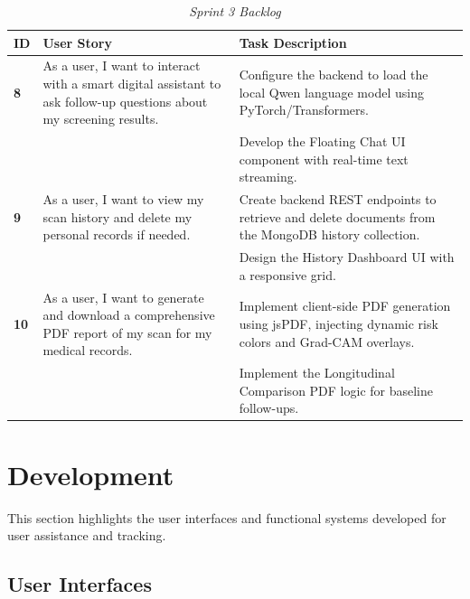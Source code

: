 \begin{table}[H]
	\centering
	\small
	\renewcommand{\arraystretch}{1.2}
	\begin{tabular}{|>{\centering\arraybackslash}p{0.8cm}|>{\raggedright\arraybackslash}p{4.5cm}|>{\raggedright\arraybackslash}p{6.8cm}|}
		\hline
		\rowcolor[HTML]{1F3864}
		{\color{white}\textbf{ID}} & {\color{white}\textbf{User Story}} & {\color{white}\textbf{Task Description}} \\
		\hline
		\textbf{8} & As a user, I want to interact with a smart digital assistant to ask follow-up questions about my screening results. & Configure the backend to load the local Qwen language model using PyTorch/Transformers. \\
		\cline{3-3}
		& & Develop the Floating Chat UI component with real-time text streaming. \\
		\hline
		\textbf{9} & As a user, I want to view my scan history and delete my personal records if needed. & Create backend REST endpoints to retrieve and delete documents from the MongoDB history collection. \\
		\cline{3-3}
		& & Design the History Dashboard UI with a responsive grid. \\
		\hline
		\textbf{10} & As a user, I want to generate and download a comprehensive PDF report of my scan for my medical records. & Implement client-side PDF generation using jsPDF, injecting dynamic risk colors and Grad-CAM overlays. \\
		\cline{3-3}
		& & Implement the Longitudinal Comparison PDF logic for baseline follow-ups. \\
		\hline
	\end{tabular}
	\caption{\textit{Sprint 3 Backlog}}
	\label{tab:sprint3_backlog}
\end{table}

\section{Development}
This section highlights the user interfaces and functional systems developed for user assistance and tracking.

\subsection{User Interfaces}

